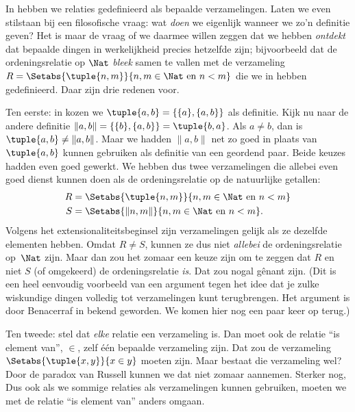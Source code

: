 \documentclass[../../../include/open-logic-section]{subfiles}
\begin{document}

In  hebben we relaties gedefinieerd als bepaalde
verzamelingen. Laten we even stilstaan bij een filosofische vraag: wat
\emph{doen} we eigenlijk wanneer we zo'n definitie geven? Het is maar
de vraag of we daarmee willen zeggen dat we hebben \emph{ontdekt}
dat bepaalde dingen in werkelijkheid precies hetzelfde zijn;
bijvoorbeeld dat de ordeningsrelatie op $\Nat$ \emph{bleek} samen te
vallen met de verzameling $R=
\Setabs{\tuple{n,m}}{n, m \in \Nat\text{ en } n < m}$ die we in
 hebben gedefinieerd. Daar zijn drie
redenen voor.

Ten eerste: in  kozen we
$\tuple{a, b} = \{\{a\}, \{a, b\}\}$ als definitie. Kijk nu naar de
andere definitie $\lVert a, b\rVert = \{\{b\}, \{a, b\}\} =
\tuple{b,a}$. Als $a \neq b$, dan is $\tuple{a, b} \neq \lVert
a,b\rVert$. Maar we hadden $\lVert a,b\rVert$ net zo goed in plaats
van $\tuple{a,b}$ kunnen gebruiken als definitie van een geordend paar.
Beide keuzes hadden even goed gewerkt. We hebben dus twee
verzamelingen die allebei even goed dienst kunnen doen als de
ordeningsrelatie op de natuurlijke getallen:
\begin{align*}
		R &= \Setabs{\tuple{n,m}}{n, m \in \Nat \text{ en }n < m}\\
		S &= \Setabs{\lVert n,m\rVert}{n, m \in \Nat \text{ en }n < m}.
\end{align*}
Volgens het extensionaliteitsbeginsel zijn verzamelingen gelijk als ze
dezelfde elementen hebben. Omdat $R \neq S$, kunnen ze dus niet
\emph{allebei} de ordeningsrelatie op~$\Nat$ zijn.
Maar dan zou het zomaar een keuze zijn om te zeggen dat $R$ en niet $S$
(of omgekeerd) de ordeningsrelatie \emph{is}. Dat zou nogal gênant
zijn. (Dit is een heel eenvoudig voorbeeld van een argument tegen het
idee dat je zulke wiskundige dingen volledig tot verzamelingen kunt
terugbrengen. Het argument is door Benacerraf in
\citeyear{Benacerraf1965} bekend geworden. We komen hier nog een paar
keer op terug.)

Ten tweede: stel dat \emph{elke} relatie een verzameling is. Dan moet
ook de relatie ``is element van'', $\in$, zelf één bepaalde
verzameling zijn. Dat zou de verzameling
$\Setabs{\tuple{x,y}}{x \in y}$ moeten zijn. Maar bestaat die
verzameling wel? Door de paradox van Russell kunnen we dat niet zomaar
aannemen. Sterker nog,
Dus ook als we sommige relaties als verzamelingen kunnen gebruiken,
moeten we met de relatie ``is element van'' anders omgaan.
\end{document}
